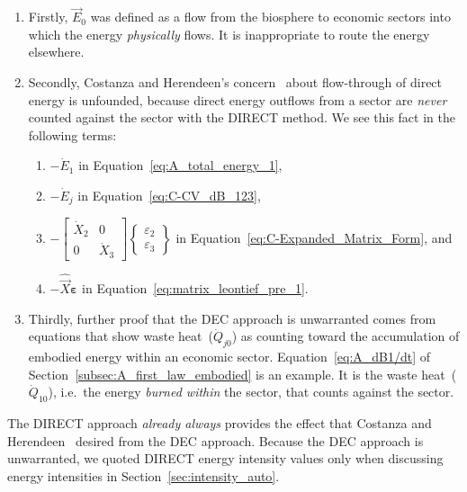 \begin{enumerate}
	\item 
		Firstly, $\vec{E}_{0}$ was defined as a flow 
		from the biosphere to economic sectors
		into which the energy \emph{physically} flows.
		It is inappropriate to route the energy elsewhere.
	\item 
		Secondly, Costanza and Herendeen's 
		concern~\cite[pp. 130 \& 138]{Costanza:1984tq}
		about flow-through of direct energy is unfounded, 
		because direct energy outflows from a sector
		are \emph{never} counted against the sector
		with the DIRECT method.
		We see this fact in the following terms:
			\begin{enumerate}
				\item
					{$- \dot{E}_{1}$ in 
					Equation~\ref{eq:A_total_energy_1},}
				\item
					{$- \dot{E}_{j}$ in Equation~\ref{eq:C-CV_dB_123},}
				\item
					{$- 
						\begin{bmatrix}
							\dot{X}_{2} & 0          \\
							0           & \dot{X}_{3}
						\end{bmatrix}
						\begin{Bmatrix}
							\varepsilon_{2}\\
							\varepsilon_{3}
						\end{Bmatrix}
					$
					in Equation~\ref{eq:C-Expanded_Matrix_Form}, and}
				\item
					{$- \hat{\vec{X}}\boldsymbol{\varepsilon}$ 
					in Equation~\ref{eq:matrix_leontief_pre_1}.}
			\end{enumerate}
	\item
		Thirdly, further proof that the DEC approach is unwarranted
		comes from equations that show waste 
		heat~($\dot{Q}_{j0}$) as counting toward 
		the accumulation of embodied energy within 
		an economic sector.
		Equation~\ref{eq:A_dB1/dt} of 
		Section~\ref{subsec:A_first_law_embodied}
		is an example. 
		It is the waste heat~($\dot{Q}_{10}$), 
		i.e.\ the energy \emph{burned within} the sector,
		that counts against the sector.
\end{enumerate}
The DIRECT approach \emph{already always} provides 
the effect that Costanza and Herendeen~\cite{Costanza:1984tq}
desired from the DEC approach. 
Because the DEC approach is unwarranted, 
we quoted DIRECT energy intensity values only
when discussing energy intensities in 
Section~\ref{sec:intensity_auto}.






